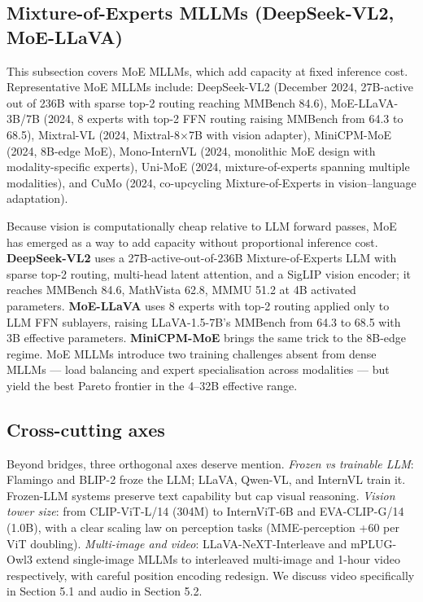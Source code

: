 \documentclass{article}
\begin{document}
\subsection{Mixture-of-Experts MLLMs (DeepSeek-VL2, MoE-LLaVA)}\label{mixture-of-experts-mllms-deepseek-vl2-moe-llava}

This subsection covers MoE MLLMs, which add capacity at fixed inference cost. Representative MoE MLLMs include: DeepSeek-VL2 (December 2024, 27B-active out of 236B with sparse top-2 routing reaching MMBench 84.6), MoE-LLaVA-3B/7B (2024, 8 experts with top-2 FFN routing raising MMBench from 64.3 to 68.5), Mixtral-VL (2024, Mixtral-8×7B with vision adapter), MiniCPM-MoE (2024, 8B-edge MoE), Mono-InternVL (2024, monolithic MoE design with modality-specific experts), Uni-MoE (2024, mixture-of-experts spanning multiple modalities), and CuMo (2024, co-upcycling Mixture-of-Experts in vision--language adaptation).

Because vision is computationally cheap relative to LLM forward passes, MoE has emerged as a way to add capacity without proportional inference cost. \textbf{DeepSeek-VL2} \citep{wu20242024} uses a 27B-active-out-of-236B Mixture-of-Experts LLM with sparse top-2 routing, multi-head latent attention, and a SigLIP vision encoder; it reaches MMBench 84.6, MathVista 62.8, MMMU 51.2 at 4B activated parameters. \textbf{MoE-LLaVA} uses 8 experts with top-2 routing applied only to LLM FFN sublayers, raising LLaVA-1.5-7B's MMBench from 64.3 to 68.5 with 3B effective parameters. \textbf{MiniCPM-MoE} brings the same trick to the 8B-edge regime. MoE MLLMs introduce two training challenges absent from dense MLLMs --- load balancing and expert specialisation across modalities --- but yield the best Pareto frontier in the 4--32B effective range.

\subsection{Cross-cutting axes}\label{cross-cutting-axes}

Beyond bridges, three orthogonal axes deserve mention. \emph{Frozen vs trainable LLM}: Flamingo and BLIP-2 froze the LLM; LLaVA, Qwen-VL, and InternVL train it. Frozen-LLM systems preserve text capability but cap visual reasoning. \emph{Vision tower size}: from CLIP-ViT-L/14 (304M) to InternViT-6B and EVA-CLIP-G/14 (1.0B), with a clear scaling law on perception tasks (MME-perception +60 per ViT doubling). \emph{Multi-image and video}: LLaVA-NeXT-Interleave \citep{li20242024} and mPLUG-Owl3 \citep{ye20242024} extend single-image MLLMs to interleaved multi-image and 1-hour video respectively, with careful position encoding redesign. We discuss video specifically in Section 5.1 and audio in Section 5.2.
\end{document}
